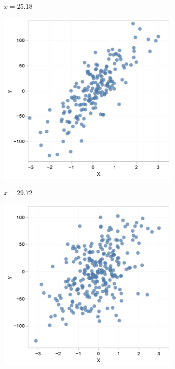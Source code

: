 \begin{figure}
\begin{subfigure}[b]{0.19\textwidth}
        \label{figure: scatter2}
        \caption{\(x = 25.18\)}
    \end{subfigure}
    \hfill
    \begin{subfigure}[b]{0.19\textwidth}
        \centering
        \includegraphics[width=\textwidth]{figures/body/methodology/linear_scatter3.png}
        \label{figure: scatter3}
        \caption{\(x = 29.72\)}
    \end{subfigure}
    \hfill
    \begin{subfigure}[b]{0.19\textwidth}
        \centering
        \includegraphics[width=\textwidth]{figures/body/methodology/linear_scatter4.png}

\end{subfigure}
\end{figure}
